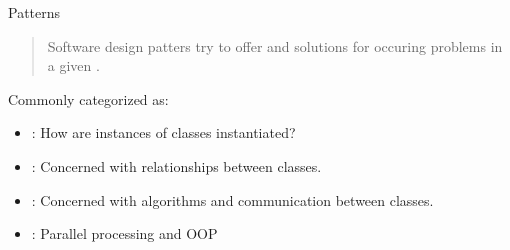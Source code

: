 \begin{frame}{Patterns}
	\begin{quote}
		Software design patters try to offer  and  solutions for  occuring problems in a given .
	\end{quote}

	\bigskip

	Commonly categorized as:

	\medskip
	\begin{itemize}
		\item
		: How are instances of classes instantiated? 
		\item
		: Concerned with relationships between classes. 
		\item
		: Concerned with algorithms and communication between classes. 
		\item
		: Parallel processing and OOP 
	\end{itemize}
\end{frame}
%
%
%